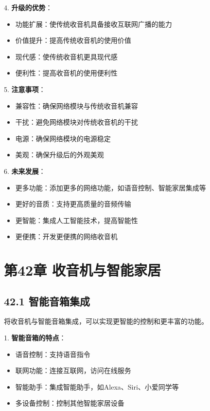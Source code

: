 \documentclass[12pt,UTF8]{ctexbook}
\begin{document}
4. \textbf{升级的优势}：
   \begin{itemize}[leftmargin=3.5em]
   \item 功能扩展：使传统收音机具备接收互联网广播的能力
   \item 价值提升：提高传统收音机的使用价值
   \item 现代感：使传统收音机更具现代感
   \item 便利性：提高收音机的使用便利性
   \end{itemize}

5. \textbf{注意事项}：
   \begin{itemize}[leftmargin=3.5em]
   \item 兼容性：确保网络模块与传统收音机兼容
   \item 干扰：避免网络模块对传统收音机的干扰
   \item 电源：确保网络模块的电源稳定
   \item 美观：确保升级后的外观美观
   \end{itemize}

6. \textbf{未来发展}：
   \begin{itemize}[leftmargin=3.5em]
   \item 更多功能：添加更多的网络功能，如语音控制、智能家居集成等
   \item 更好的音质：支持更高质量的音频传输
   \item 更智能：集成人工智能技术，提高智能性
   \item 更便携：开发更便携的网络收音机
   \end{itemize}

\chapter*{第42章 收音机与智能家居}
\section*{42.1 智能音箱集成}

将收音机与智能音箱集成，可以实现更智能的控制和更丰富的功能。

1. \textbf{智能音箱的特点}：
   \begin{itemize}[leftmargin=3.5em]
   \item 语音控制：支持语音指令
   \item 联网功能：连接互联网，访问在线服务
   \item 智能助手：集成智能助手，如Alexa、Siri、小爱同学等
   \item 多设备控制：控制其他智能家居设备
   \end{itemize}
\end{document}
